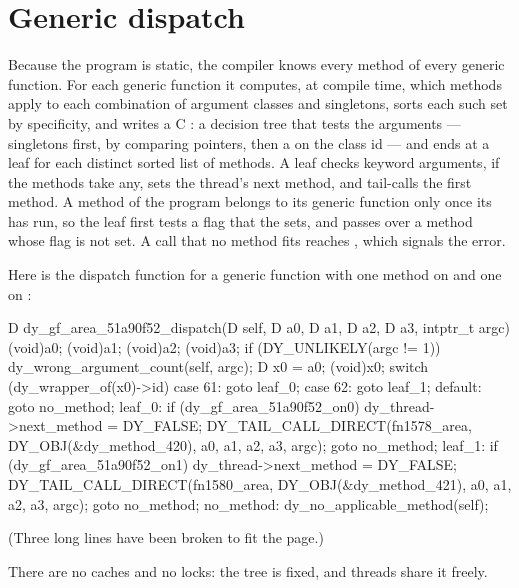 \section{Generic dispatch}\label{sec:internals-dispatch}

Because the program is static, the compiler knows every method of every
generic function. For each generic function it computes, at compile
time, which methods apply to each combination of argument classes and
singletons, sorts each such set by specificity, and writes a C
: a decision tree that tests the arguments ---
singletons first, by comparing pointers, then a  on the
class id --- and ends at a leaf for each distinct sorted list of
methods. A leaf checks keyword arguments, if the methods take any, sets
the thread's next method, and tail-calls the first method. A method of
the program belongs to its generic function only once its
 has run, so the leaf first tests a flag that the
 sets, and passes over a method whose flag is not
set. A call that no method fits reaches
, which signals the error.

Here is the dispatch function for a generic function  with
one method on  and one on :

\begin{ccode}
D dy_gf_area_51a90f52_dispatch(D self, D a0, D a1, D a2, D a3,
                               intptr_t argc) {
    (void)a0; (void)a1; (void)a2; (void)a3;
    if (DY_UNLIKELY(argc != 1)) dy_wrong_argument_count(self, argc);
    D x0 = a0; (void)x0;
    switch (dy_wrapper_of(x0)->id) {
    case 61:
        goto leaf_0;
    case 62:
        goto leaf_1;
    default: goto no_method;
    }
leaf_0:
    if (dy_gf_area_51a90f52_on0) {
        dy_thread->next_method = DY_FALSE;
        DY_TAIL_CALL_DIRECT(fn1578_area, DY_OBJ(&dy_method_420),
                            a0, a1, a2, a3, argc);
    }
    goto no_method;
leaf_1:
    if (dy_gf_area_51a90f52_on1) {
        dy_thread->next_method = DY_FALSE;
        DY_TAIL_CALL_DIRECT(fn1580_area, DY_OBJ(&dy_method_421),
                            a0, a1, a2, a3, argc);
    }
    goto no_method;
no_method:
    dy_no_applicable_method(self);
}
\end{ccode}

\noindent (Three long lines have been broken to fit the page.)

There are no caches and no locks: the tree is fixed, and threads share
it freely.

